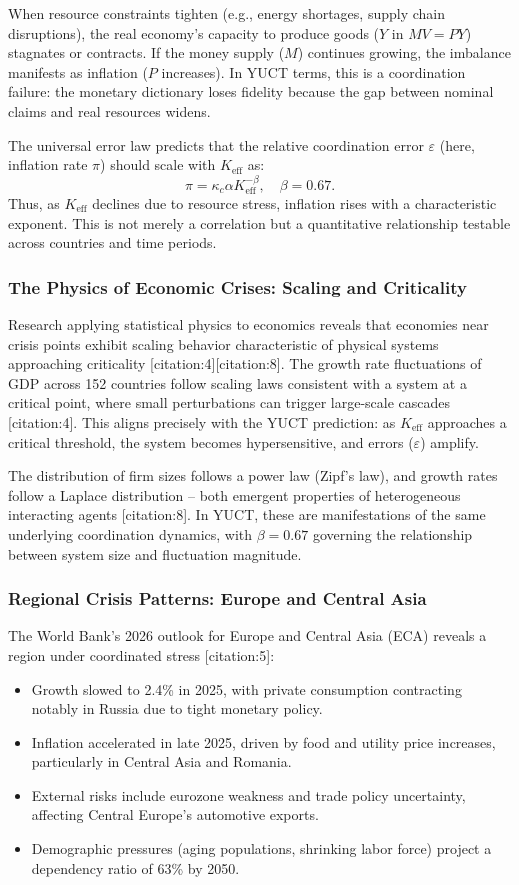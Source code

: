 \documentclass[11pt,a4paper]{article}
\theoremstyle{remark}
\begin{document}
	When resource constraints tighten (e.g., energy shortages, supply chain disruptions), the real economy's capacity to produce goods (\(Y\) in \(MV = PY\)) stagnates or contracts. If the money supply (\(M\)) continues growing, the imbalance manifests as inflation (\(P\) increases). In YUCT terms, this is a coordination failure: the monetary dictionary loses fidelity because the gap between nominal claims and real resources widens.
	
	The universal error law predicts that the relative coordination error \(\varepsilon\) (here, inflation rate \(\pi\)) should scale with \(K_{\text{eff}}\) as:
	\[
	\pi = \kappa_c \alpha K_{\text{eff}}^{-\beta}, \quad \beta = 0.67.
	\]
	Thus, as \(K_{\text{eff}}\) declines due to resource stress, inflation rises with a characteristic exponent. This is not merely a correlation but a quantitative relationship testable across countries and time periods.
	
	\subsubsection{The Physics of Economic Crises: Scaling and Criticality}
	Research applying statistical physics to economics reveals that economies near crisis points exhibit scaling behavior characteristic of physical systems approaching criticality [citation:4][citation:8]. The growth rate fluctuations of GDP across 152 countries follow scaling laws consistent with a system at a critical point, where small perturbations can trigger large-scale cascades [citation:4]. This aligns precisely with the YUCT prediction: as \(K_{\text{eff}}\) approaches a critical threshold, the system becomes hypersensitive, and errors (\(\varepsilon\)) amplify.
	
	The distribution of firm sizes follows a power law (Zipf's law), and growth rates follow a Laplace distribution – both emergent properties of heterogeneous interacting agents [citation:8]. In YUCT, these are manifestations of the same underlying coordination dynamics, with \(\beta = 0.67\) governing the relationship between system size and fluctuation magnitude.
	
	\subsubsection{Regional Crisis Patterns: Europe and Central Asia}
	The World Bank's 2026 outlook for Europe and Central Asia (ECA) reveals a region under coordinated stress [citation:5]:
	\begin{itemize}
		\item Growth slowed to 2.4\% in 2025, with private consumption contracting notably in Russia due to tight monetary policy.
		\item Inflation accelerated in late 2025, driven by food and utility price increases, particularly in Central Asia and Romania.
		\item External risks include eurozone weakness and trade policy uncertainty, affecting Central Europe's automotive exports.
		\item Demographic pressures (aging populations, shrinking labor force) project a dependency ratio of 63\% by 2050.
	\end{itemize}
	
\end{document}
